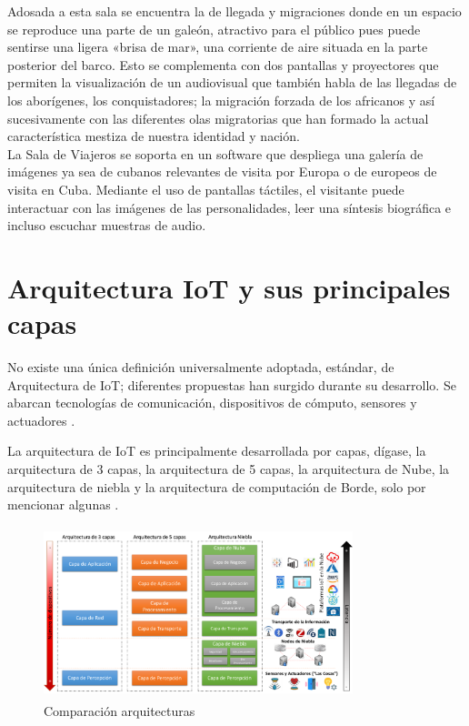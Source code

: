         Adosada a esta sala se encuentra la de llegada y migraciones donde en un espacio se reproduce una parte de un galeón, atractivo para el público pues puede sentirse una ligera «brisa de mar», una corriente de aire situada en la parte posterior del barco. Esto se complementa con dos pantallas y proyectores que permiten la visualización de un audiovisual que también habla de las llegadas de los aborígenes, los conquistadores; la migración forzada de los africanos y así sucesivamente con las diferentes olas migratorias que han formado la actual característica mestiza de nuestra identidad y nación.\\
        
        La Sala de Viajeros se soporta en un software que despliega una galería de imágenes ya sea de cubanos relevantes de visita por Europa o de europeos de visita en Cuba. Mediante el uso de pantallas táctiles, el visitante puede interactuar con las imágenes de las personalidades, leer una síntesis biográfica e incluso escuchar muestras de audio.
    
        
    \section{Arquitectura IoT y sus principales capas}\label{sec:arquitecturas}

    No existe una única definición universalmente adoptada, estándar, de Arquitectura de IoT; diferentes propuestas han surgido durante su desarrollo. Se abarcan tecnologías de comunicación, dispositivos de cómputo, sensores y actuadores \cite{ioT_en_Cosas_de_salud}.


    
    La arquitectura de IoT es principalmente desarrollada por capas, dígase, la arquitectura de 3 capas, la arquitectura de 5 capas, la arquitectura de Nube, la arquitectura de niebla y la arquitectura de computación de Borde, solo por mencionar algunas \cite{arquitecturaIEEE}.\\

    \begin{figure}[h]
        \centering
        \includegraphics[width=9cm, height=5cm]{imagenes/Comparacion-arquitecturas-1024x535}
        \caption{Comparación arquitecturas}
        \label{imag:comparacionArquitecturas}
    \end{figure}

